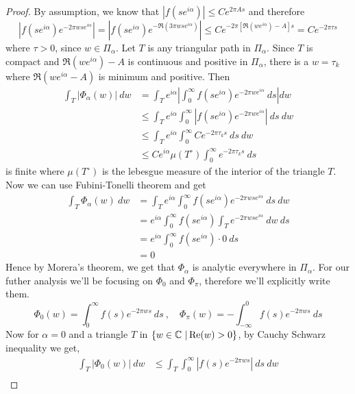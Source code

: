 \begin{proof}
  By assumption, we know that $\left|f(se^{i\alpha})\right| \le Ce^{2\pi As}$ and therefore $$\left|f(se^{i\alpha})e^{-2\pi wse^{i\alpha}}\right| = \left|f(se^{i\alpha})e^{-\Re(3\pi wse^{i\alpha})}\right| \le Ce^{-2\pi[\Re(we^{i\alpha}) - A]s} = Ce^{-2\pi \tau s}$$
  where $\tau > 0$, since $w \in \Pi_\alpha$. Let $T$ is any triangular path in $\Pi_\alpha$. Since $T$ is compact and $\Re(we^{i\alpha})-A$ is continuous and positive in $\Pi_\alpha$, there is a $w = \tau_k$ where $\Re(we^{i\alpha} - A)$ is minimum and positive. Then 
  \begin{align*}
    \int_T\left|\Phi_\alpha(w)\right| \ dw &= \int_T e^{i\alpha} \left|\int_0^\infty f(se^{i\alpha}) e^{-2\pi we^{i\alpha}} \ ds \right| dw \\
      & \le \int_T e^{i\alpha} \int_0^\infty \left|f(se^{i\alpha}) e^{-2\pi we^{i\alpha}} \right| \ ds \ dw \\
      & \le \int_T e^{i\alpha} \int_0^\infty Ce^{-2\pi \tau_k s} \ ds \ dw \\
      & \le Ce^{i\alpha} \mu(T^\circ) \int_0^\infty e^{-2\pi \tau_k s} \ ds
  \end{align*}
  is finite where $\mu(T^\circ)$ is the lebesgue measure of the interior of the triangle $T$. 
  Now we can use Fubini-Tonelli theorem and get
  \begin{align*}
    \int_T \Phi_\alpha(w) \ dw &= \int_T e^{i\alpha} \int_0^\infty f(se^{i\alpha}) e^{-2\pi w s e^{i\alpha}} \ ds \ dw \\
    & = e^{i\alpha}\int_0^\infty f(se^{i\alpha}) \int_T e^{-2\pi wse^{i\alpha}} \ dw \ ds \\
    & = e^{i\alpha} \int_0^\infty f(se^{i\alpha}) \cdot 0 \ ds \\
    & = 0
  \end{align*}
  Hence by Morera's theorem, we get that $\Phi_\alpha$ is analytic everywhere in $\Pi_\alpha$. For our futher analysis we'll be focusing on $\Phi_0$ and $\Phi_\pi$, therefore we'll explicitly write them.
  \begin{equation*}
  \boxed{\Phi_0(w) = \int_0^\infty f(s) e^{-2\pi w s} \ ds \ , \quad \Phi_\pi(w) = -\int^0_{-\infty} f(s) e^{-2\pi w s} \ ds}
  \end{equation*}
  Now for $\alpha = 0$ and a triangle $T$ in $\{w \in \mathbb C \ | \operatorname{Re}(w) > 0 \}$, by Cauchy Schwarz inequality we get,
  \begin{align*}
    \int_T \left| \Phi_0(w)\right| \ dw & \le \int_T \int_0^\infty \left| f(s)e^{-2\pi w s}\right| \ ds \ dw \\

\end{align*}
\end{proof}
